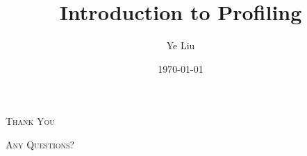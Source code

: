 \documentclass{zjusct-beamer/zjusct}
\title{Introduction to Profiling}
\author[Zircon]{Ye Liu}
\date{\today}
\institute[ZJUSCT]{Zhejiang University Supercomputing Team}
\begin{document}
\setmonofont{DejaVu Sans Mono}

\maketitle

\cutoc





\begin{frame}[standout]
    \Huge\textsc{Thank You}

    \vfill

    \LARGE\textsc{Any Questions?}
\end{frame}
\end{document}
